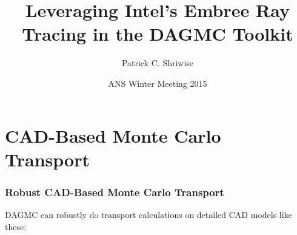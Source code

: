 \documentclass[12pt]{beamer}
\title{Leveraging Intel's Embree Ray Tracing in the DAGMC Toolkit}
\author{Patrick C. Shriwise}
\institute{University of Wisconsin - Madison}
\date{ANS Winter Meeting 2015}
\begin{document}
\frame{\titlepage \addtocounter{framenumber}{-1}}



\section{CAD-Based Monte Carlo Transport} %
\begin{frame}

\frametitle{Robust CAD-Based Monte Carlo Transport}

DAGMC can robustly do transport calculations on detailed CAD models like these:


\begin{center}
\begin{tabular}{c c}


\end{tabular}
\end{center}
\end{frame}
\end{document}
